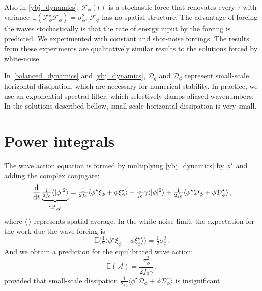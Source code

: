 \documentclass[12pt]{article}
\newcommand{\defn}{\ensuremath{\stackrel{\mathrm{def}}{=}}}
\newcommand{\per}{\, .}
\newcommand{\com}{\, ,}
\def\beq{\begin{equation}}
\def\eeq{\end{equation}}
\newcommand{\half}{\tfrac{1}{2}}
\newcommand{\phis}{\phi^\star}
\def\dd{{\rm d}}
\newcommand{\A}{\mathscr{A}}
\newcommand{\F}{{\mathscr{F}}}
\def\la{\langle}
\def\ra{\rangle}
\newcommand{\?}{\stackrel{?}{=}}
\newcommand{\D}{\mathcal{D}}
\newcommand{\Es}{\mathbb{E}}
\begin{document}
Also in \eqref{ybj_dynamics}, $\F_\phi(t)$ is a stochastic force that renovates
every $\tau$ with variance $\Es(\F_\phis\F_\phi) = \sigma_\phi^2$; $\F_\phi$ has
no spatial structure. The advantage of forcing the waves stochastically is that
the rate of energy input by the forcing is predicted. We experimented
with constant and shot-noise forcings. The results from these experiments are
 qualitatively similar results to the solutions forced by white-noise.

In \eqref{balanced_dynamics} and \eqref{ybj_dynamics}, $\D_q$ and $\D_{\phi}$ represent
small-scale horizontal dissipation, which are necessary for numerical stability.
In practice, we use an exponential spectral filter, which selectively damps aliased
wavenumbers. In the solutions described bellow, small-scale horizontal dissipation
is very small.

\section{Power integrals}

The wave action equation is formed by multiplying \eqref{ybj_dynamics} by $\phis$ and
adding the complex conjugate:
\beq
\frac{\dd}{\dd t} \underbrace{\tfrac{1}{2 f_0} \la |\phi|^2 \ra}_{\defn \A} = \tfrac{1}{2f_0}\la \phis \xi_\phi +
\phi \xi_\phis \ra -\tfrac{1}{f_0}\gamma \la |\phi|^2 \ra + \tfrac{1}{2f_0} \la \phis\D_\phi + \phi\D_\phis \ra\com
\label{A}
\eeq
where $\la\,\ra$ represents spatial average. In the white-noise limit, the expectation for
the work due the wave forcing is
\beq
\Es\Big(\tfrac{1}{2}\la \phis \xi_\phi+\phi \xi_\phis \ra\Big) = \half\sigma_\phi^2\per
\eeq
And we obtain a prediction for the equilibrated wave action:
\beq
\label{prediced_A}
\Es(\A) = \frac{\sigma_\phi^2}{2 f_0 \gamma}\com
\eeq
provided that small-scale dissipation $\tfrac{1}{2f_0}\la\phis\D_\phi+\phi\D_\phis\ra$
is insignificant.
\end{document}
